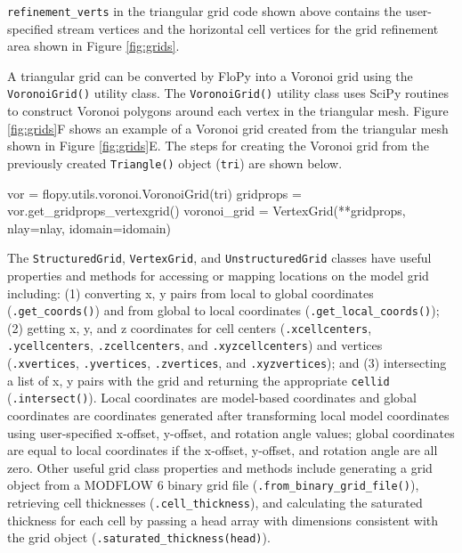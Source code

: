 \documentclass[12pt, oneside]{article}  	%
\begin{document}
\noindent \texttt{refinement\_verts} in the triangular grid code shown above contains the user-specified stream vertices and the horizontal cell vertices for the grid refinement area shown in Figure \ref{fig:grids}. 

A triangular grid can be converted by FloPy into a Voronoi grid using the \texttt{VoronoiGrid()} utility class. The \texttt{VoronoiGrid()} utility class uses SciPy routines \citep{2020SciPy-NMeth} to construct Voronoi polygons around each vertex in the triangular mesh. Figure \ref{fig:grids}F shows an example of a Voronoi grid created from the triangular mesh shown in Figure \ref{fig:grids}E. The steps for creating the Voronoi grid from the previously created \texttt{Triangle()} object (\texttt{tri}) are shown below.

\begin{python}
vor = flopy.utils.voronoi.VoronoiGrid(tri)
gridprops = vor.get_gridprops_vertexgrid()
voronoi_grid = VertexGrid(**gridprops, nlay=nlay, idomain=idomain)
\end{python}

The \texttt{StructuredGrid}, \texttt{VertexGrid}, and \texttt{UnstructuredGrid} classes have useful properties and methods for accessing or mapping locations on the model grid including: (1) converting x, y pairs from local to global coordinates (\texttt{.get\_coords()}) and from global to local coordinates (\texttt{.get\_local\_coords()}); (2) getting x, y, and z coordinates for cell centers (\texttt{.xcellcenters}, \texttt{.ycellcenters}, \texttt{.zcellcenters}, and \texttt{.xyzcellcenters}) and vertices (\texttt{.xvertices}, \texttt{.yvertices}, \texttt{.zvertices}, and \texttt{.xyzvertices}); and (3) intersecting a list of x, y pairs with the grid and returning the appropriate \texttt{cellid} (\texttt{.intersect()}). Local coordinates are model-based coordinates and global coordinates are coordinates generated after transforming local model coordinates using user-specified x-offset, y-offset, and rotation angle values; global coordinates are equal to local coordinates if the x-offset, y-offset, and rotation angle are all zero. Other useful grid class properties and methods include generating a grid object from a MODFLOW 6 binary grid file (\texttt{.from\_binary\_grid\_file()}), retrieving cell thicknesses (\texttt{.cell\_thickness}), and calculating the saturated thickness for each cell by passing a head array with dimensions consistent with the grid object (\texttt{.saturated\_thickness(head)}).
\end{document}
